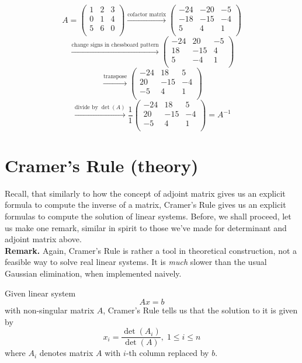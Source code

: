 \documentclass[8pt]{article} %
\begin{document}
\begin{myeg}
\[A=
\left(\begin{array}{rrr}
1&2&3\\
0&1&4\\
5&6&0\\
\end{array}\right)
	\xrightarrow{\text{cofactor matrix}}
\left(\begin{array}{rrr}
-24&-20&-5\\
-18&-15&-4\\
5&4&1\\
\end{array}\right)
		\]
	\[\xrightarrow{\text{change signs in chessboard pattern}}
\left(\begin{array}{rrr}
-24&20&-5\\
18&-15&4\\
5&-4&1\\
\end{array}\right)
		\]
	\[\xrightarrow{\text{transpose}}
\left(\begin{array}{rrr}
-24&18&5\\
20&-15&-4\\
-5&4&1\\
\end{array}\right)
		\]
		\[\xrightarrow{\text{divide by $\det(A)$}}\frac{1}{1}
\left(\begin{array}{rrr}
-24&18&5\\
20&-15&-4\\
-5&4&1\\
\end{array}\right)
		=A^{-1}\]
\end{myeg}
\section{Cramer's Rule (theory)}
Recall, that similarly to how the concept of adjoint matrix gives us an explicit formula to compute the inverse of a matrix, Cramer's Rule gives
us an explicit formulas to compute the solution of linear systems. Before, we shall proceed, let us make one remark, similar in spirit to those
we've made for determinant and adjoint matrix above.\\
\textbf{Remark. }Again, Cramer's Rule is rather a tool in theoretical construction, not a feasible way to solve real linear systems. It is
\textit{much } slower than the usual Gaussian elimination, when implemented naively.

Given linear system \[Ax=b\]
with non-singular matrix $A$, Cramer's Rule tells us that the solution to it is given by
\[x_i=\frac{\det(A_i)}{\det(A)},\;1\leq i\leq n\]
where $A_i$ denotes matrix $A$ with $i$-th column replaced by $b$.
\end{document}
